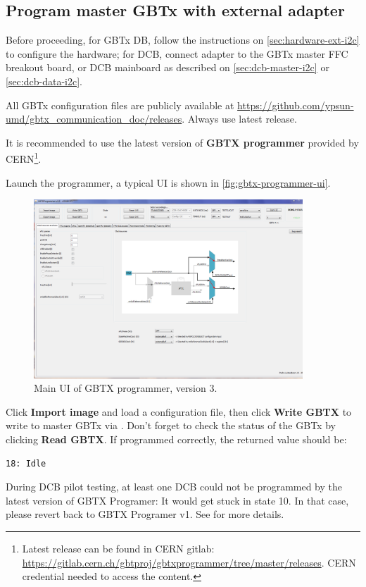 \subsection{Program master GBTx with external \itwoc adapter}
Before proceeding, for GBTx DB, follow the instructions on
\autoref{sec:hardware-ext-i2c} to configure the hardware;
for DCB, connect \itwoc adapter to the GBTx master FFC breakout board, or DCB
mainboard as described on \autoref{sec:dcb-master-i2c} or
\autoref{sec:dcb-data-i2c}.

All GBTx configuration files are publicly available at
\url{https://github.com/ypsun-umd/gbtx_communication_doc/releases}.
Always use latest release.

It is recommended to use the latest version of \textbf{GBTX programmer} provided
by CERN\footnote{
    Latest release can be found in CERN gitlab:
    \url{https://gitlab.cern.ch/gbtproj/gbtxprogrammer/tree/master/releases}.
    CERN credential needed to access the content.
}.

Launch the programmer, a typical UI is shown in
\autoref{fig:gbtx-programmer-ui}.

\begin{figure}[!ht]
    \centering
    \includegraphics[width=0.9\textwidth]{res/gbtx_programmer_v3_ui.png}
    \caption{Main UI of GBTX programmer, version 3.}
    \label{fig:gbtx-programmer-ui}
\end{figure}

Click \textbf{Import image} and load a configuration file, then click
\textbf{Write GBTX} to write to master GBTx via \itwoc.
Don't forget to check the status of the GBTx by clicking \textbf{Read GBTX}.
If programmed correctly, the returned value should be:

\begin{lstlisting}
18: Idle
\end{lstlisting}

\begin{leftbar}
    During DCB pilot testing, at least one DCB could not be programmed by the
    latest version of GBTX Programer: It would get stuck in state 10.
    In that case, please revert back to GBTX Programer v1.
    See  for more details.
\end{leftbar}
